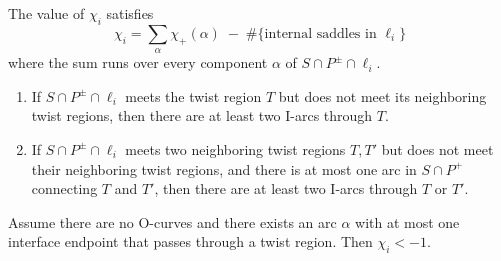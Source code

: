 \documentclass[10pt,a4paper]{amsart}
\begin{document}
\begin{lemma}\label{euler of layer is sum over arcs}
The value of $\chi_i$ satisfies
    \begin{equation}\label{eq: euler by arc}
        \chi_i = \sum_{\alpha} \chi_+(\alpha) 
        \; -\;\#\{\text{internal saddles in }\ell_i\}
    \end{equation}
    where the sum runs over every component $\alpha$ of  $S\cap P^\pm \cap \ell_i$.
\end{lemma}

\begin{lemma}\label{finding I arcs}\hfill
\begin{enumerate}[label=(\arabic*)]
\item\label{one twist region I-arcs} If $S \cap P^\pm \cap \ell_i$ meets the 
twist region $T$ but does not meet its neighboring twist regions, then there 
are at least two I-arcs through $T$. 
\item\label{two twist regions I-arcs} If $S \cap P^\pm \cap \ell_i$ meets two 
neighboring twist regions $T,T'$ but does not meet their neighboring twist 
regions, and there is at most one arc in $S\cap P^+$ connecting $T$ and $T'$, 
then there are at least two I-arcs through $T$ or $T'$.
\end{enumerate}
\end{lemma}

\begin{lemma}\label{lem:arc one interface twregion neg chi}
Assume there are no O-curves and there exists an arc $\alpha$ with at most one 
interface endpoint that passes through a twist region. Then $\chi_i<-1.$
\end{lemma}
\end{document}
